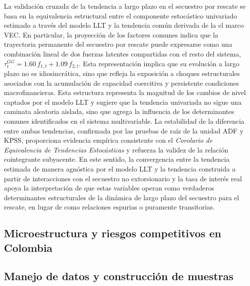 \documentclass[12pt]{article}
\theoremstyle{definition}
\theoremstyle{remark}
\newcommand{\1}{\mathbf{1}}
\begin{document}
La validación cruzada de la tendencia a largo plazo en el secuestro por rescate se basa en la equivalencia estructural entre el componente estocástico univariado estimado a través del modelo LLT y la tendencia común derivada de la el marco VEC. En particular, la proyección de los factores comunes indica que la trayectoria permanente del secuestro por rescate puede expresarse como una combinación lineal de dos fuerzas latentes compartidas con el resto del sistema, $\tau^{GG}_t = 1.60\,f_{1,t} + 1.09\,f_{2,t}$. Esta representación implica que su evolución a largo plazo no es idiosincrática, sino que refleja la exposición a choques estructurales asociados con la acumulación de capacidad coercitiva y persistente condiciones macrofinancieras. Esta estructura representa la magnitud de los cambios de nivel captados por el modelo LLT y sugiere que la tendencia univariada no sigue una caminata aleatoria aislada, sino que agrega la influencia de los determinantes comunes identificados en el sistema multivariable. La estabilidad de la diferencia entre ambas tendencias, confirmada por las pruebas de raíz de la unidad ADF y KPSS, proporciona evidencia empírica consistente con el \textit{Corolario de Equivalencia de Tendencias Estocásticas} y refuerza la validez de la relación cointegrante subyacente. En este sentido, la convergencia entre la tendencia estimada de manera agnóstica por el modelo LLT y la tendencia construida a partir de interacciones con el secuestro no extorsionario y la tasa de interés real apoya la interpretación de que estas variables operan como verdaderos determinantes estructurales de la dinámica de largo plazo del secuestro para el rescate, en lugar de como relaciones espurias o puramente transitorias.



\subsection{Microestructura y riesgos competitivos en Colombia}
\label{sec:empirico}

\subsection{Manejo de datos y construcción de muestras}
\end{document}
